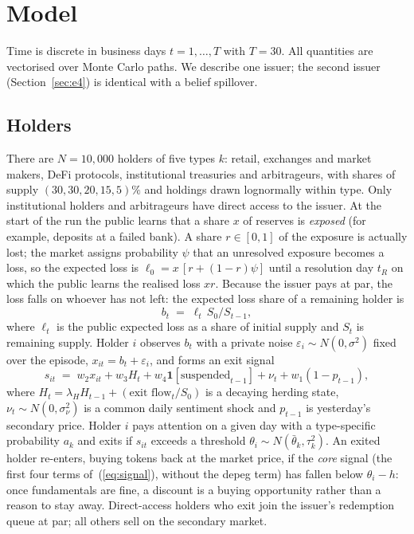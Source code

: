 \section{Model}\label{sec:model}

Time is discrete in business days $t=1,\dots,T$ with $T=30$. All quantities are vectorised over Monte Carlo
paths. We describe one issuer; the second issuer (Section~\ref{sec:e4}) is identical with a belief spillover.

\subsection{Holders}

There are $N=10{,}000$ holders of five types $k$: retail, exchanges and market makers, DeFi protocols,
institutional treasuries and arbitrageurs, with shares of supply $(30, 30, 20, 15, 5)\%$ and holdings drawn
lognormally within type. Only institutional holders and arbitrageurs have direct access to the issuer. At the
start of the run the public learns that a share $x$ of reserves is \emph{exposed} (for example, deposits at a
failed bank). A share $r\in[0,1]$ of the exposure is actually lost; the market assigns probability $\psi$ that an
unresolved exposure becomes a loss, so the expected loss is $\ell_0 = x\,[r + (1-r)\psi]$ until a resolution day
$t_R$ on which the public learns the realised loss $xr$. Because the issuer pays at par, the loss falls on whoever
has not left: the expected loss share of a remaining holder is
\begin{equation}
b_t \;=\; \ell_t\, S_0 / S_{t-1},
\end{equation}
where $\ell_t$ is the public expected loss as a share of initial supply and $S_t$ is remaining supply. Holder $i$
observes $b_t$ with a private noise $\varepsilon_i\sim N(0,\sigma^2)$ fixed over the episode, $x_{it}=b_t+\varepsilon_i$,
and forms an exit signal
\begin{equation}
s_{it} \;=\; w_2 x_{it} + w_3 H_t + w_4 \mathbf{1}[\text{suspended}_{t-1}] + \nu_t + w_1 (1-p_{t-1}),
\label{eq:signal}
\end{equation}
where $H_t = \lambda_H H_{t-1} + (\text{exit flow}_t / S_0)$ is a decaying herding state, $\nu_t\sim N(0,\sigma_\nu^2)$
is a common daily sentiment shock and $p_{t-1}$ is yesterday's secondary price. Holder $i$ pays attention on a given
day with a type-specific probability $a_k$ and exits if $s_{it}$ exceeds a threshold $\theta_i\sim N(\bar\theta_k,
\tau_k^2)$. An exited holder re-enters, buying tokens back at the market price, if the \emph{core} signal (the first
four terms of~(\ref{eq:signal}), without the depeg term) has fallen below $\theta_i - h$: once fundamentals are fine,
a discount is a buying opportunity rather than a reason to stay away. Direct-access holders who exit join the
issuer's redemption queue at par; all others sell on the secondary market.

